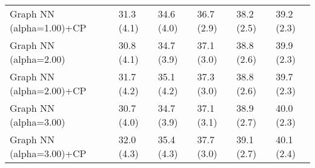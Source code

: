 \documentclass{article}
\begin{document}
\begin{table*}[t!]
\begin{center}
\begin{small}
\begin{sc}
\begin{tabular}{llllll}
Graph NN (alpha=1.00)+CP&31.3 (4.1)      &34.6 (4.0)      &36.7 (2.9)      &38.2 (2.5)      &39.2 (2.3)      \\
Graph NN (alpha=2.00)&30.8 (4.1)      &34.7 (3.9)      &37.1 (3.0)      &38.8 (2.6)      &39.9 (2.3)      \\
Graph NN (alpha=2.00)+CP&31.7 (4.2)      &35.1 (4.2)      &37.3 (3.0)      &38.8 (2.6)      &39.7 (2.3)      \\
Graph NN (alpha=3.00)&30.7 (4.0)      &34.7 (3.9)      &37.1 (3.1)      &38.9 (2.7)      &40.0 (2.3)      \\
Graph NN (alpha=3.00)+CP&32.0 (4.3)      &35.4 (4.3)      &37.7 (3.0)      &39.1 (2.7)      &40.1 (2.4)      \\
\bottomrule
\end{tabular}
\end{sc}
\end{small}
\end{center}
\vskip -0.1in
\end{table*}
\end{document}

